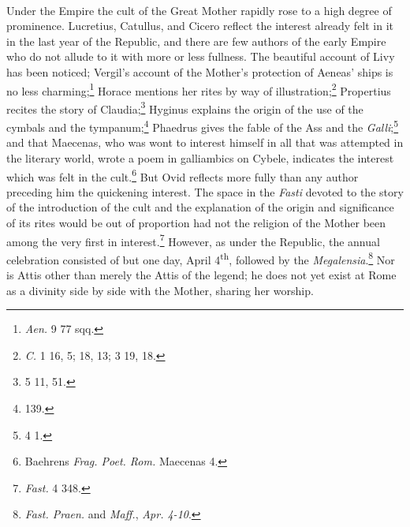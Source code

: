 \documentclass[a4paper, 11pt, oneside, polutonikogreek, english]{article}
\begin{document}
\paragraph{}
Under the Empire the cult of the Great Mother rapidly rose to a high degree of prominence. Lucretius, Catullus, and Cicero reflect the interest already felt in it in the last year of the Republic, and there are few authors of the early Empire who do not allude to it with more or less fullness. The beautiful account of Livy has been noticed; Vergil's account of the Mother's protection of Aeneas' ships is no less charming;\footnote{\emph{Aen.} 9 77 sqq.} Horace mentions her rites by way of illustration;\footnote{\emph{C.} 1 16, 5; 18, 13; 3 19, 18.} Propertius recites the story of Claudia;\footnote{5 11, 51.} Hyginus explains the origin of the use of the cymbals and the tympanum;\footnote{139.} Phaedrus gives the fable of the Ass and the \emph{Galli};\footnote{4 1.} and that Maecenas, who was wont to interest himself in all that was attempted in the literary world, wrote a poem in galliambics on Cybele, indicates the interest which was felt in the cult.\footnote{Baehrens \emph{Frag. Poet. Rom.} Maecenas 4.} But Ovid reflects more fully than any author preceding him the quickening interest. The space in the \emph{Fasti} devoted to the story of the introduction of the cult and the explanation of the origin and significance of its rites would be out of proportion had not the religion of the Mother been among the very first in interest.\footnote{\emph{Fast.} 4 348.} However, as under the Republic, the annual celebration consisted of but one day, April 4\textsuperscript{th}, followed by the \emph{Megalensia}.\footnote{\emph{Fast. Praen.} and \emph{Maff.}, \emph{Apr. 4-10}.} Nor is Attis other than merely the Attis of the legend; he does not yet exist at Rome as a divinity side by side with the Mother, sharing her worship.
\end{document}
